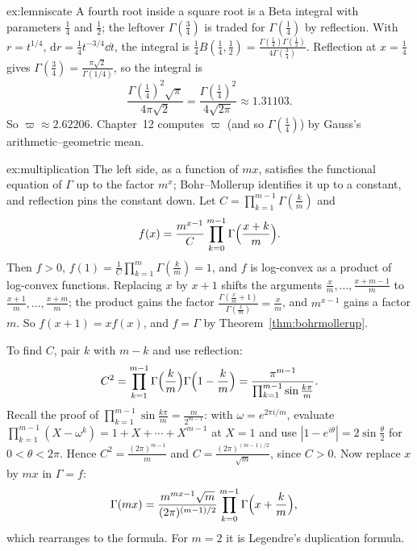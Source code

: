 \begin{solution}{ex:lemniscate}
\idea A fourth root inside a square root is a Beta integral with parameters $\frac14$ and $\frac12$; the leftover $\Gamma(\frac34)$ is
traded for $\Gamma(\frac14)$ by reflection.
\writeup With $r=t^{1/4}$, $\mathrm dr=\frac14t^{-3/4}\dd t$, the integral is $\frac14B(\frac14,\frac12)=\frac{\Gamma(\frac14)\Gamma(\frac12)}{4\Gamma(\frac34)}$. Reflection at
$x=\frac14$ gives $\Gamma(\frac34)=\frac{\pi\sqrt2}{\Gamma(1/4)}$, so the integral is
\[
\frac{\Gamma(\frac14)^2\sqrt\pi}{4\pi\sqrt2}=\frac{\Gamma(\frac14)^2}{4\sqrt{2\pi}}\approx1.31103.
\]
So $\varpi\approx2.62206$. Chapter~12 computes $\varpi$ (and so $\Gamma(\frac14)$) by Gauss's arithmetic--geometric mean.
\end{solution}

\begin{solution}{ex:multiplication}
\idea The left side, as a function of $mx$, satisfies the functional equation of $\Gamma$ up to the factor $m^x$; Bohr--Mollerup
identifies it up to a constant, and reflection pins the constant down.
\writeup Let $C=\prod_{k=1}^{m-1}\Gamma(\frac km)$ and
\[
f(x)=\frac{m^{x-1}}C\prod_{k=0}^{m-1}\Gamma\Bigl(\frac{x+k}m\Bigr).
\]
Then $f>0$, $f(1)=\frac1C\prod_{k=1}^m\Gamma(\frac km)=1$, and
$f$ is log-convex as a product of log-convex functions. Replacing $x$ by $x+1$ shifts the arguments $\frac xm,\dots,\frac{x+m-1}m$ to
$\frac{x+1}m,\dots,\frac{x+m}m$; the product gains the factor $\frac{\Gamma(\frac xm+1)}{\Gamma(\frac xm)}=\frac xm$, and $m^{x-1}$ gains a factor $m$. So
$f(x+1)=xf(x)$, and $f=\Gamma$ by Theorem~\ref{thm:bohrmollerup}.

To find $C$, pair $k$ with $m-k$ and use reflection:
\[
C^2=\prod_{k=1}^{m-1}\Gamma\Bigl(\frac km\Bigr)\Gamma\Bigl(1-\frac km\Bigr)=\frac{\pi^{m-1}}{\prod_{k=1}^{m-1}\sin\frac{k\pi}m}.
\]
Recall the proof of $\prod_{k=1}^{m-1}\sin\frac{k\pi}m=\frac m{2^{m-1}}$: with $\omega=e^{2\pi i/m}$, evaluate $\prod_{k=1}^{m-1}(X-\omega^k)=1+X+\cdots+X^{m-1}$ at
$X=1$ and use $|1-e^{i\theta}|=2\sin\frac\theta2$ for $0<\theta<2\pi$. Hence $C^2=\frac{(2\pi)^{m-1}}m$ and $C=\frac{(2\pi)^{(m-1)/2}}{\sqrt m}$, since $C>0$. Now replace $x$
by $mx$ in $\Gamma=f$:
\[
\begin{aligned}\Gamma(mx)&=\frac{m^{mx-1}\sqrt m}{(2\pi)^{(m-1)/2}}\prod_{k=0}^{m-1}\Gamma\Bigl(x+\frac km\Bigr),\end{aligned}
\]
which rearranges to the formula. For $m=2$ it is Legendre's duplication formula.
\end{solution}

